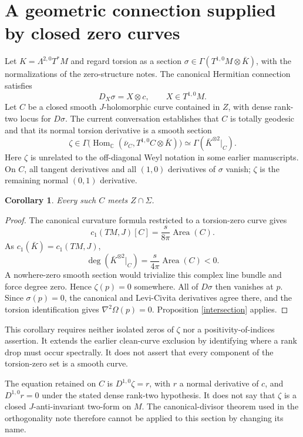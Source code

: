 \documentclass[11pt]{article}
\newtheorem{corollary}[proposition]{Corollary}
\begin{document}
\section{A geometric connection supplied by closed zero curves}
Let $K=\Lambda^{2,0}T^*M$ and regard torsion as a section
$\sigma\in\Gamma(T^{1,0}M\otimes\bar K)$, with the normalizations of
the zero-structure notes. The canonical Hermitian connection satisfies
\[
D_X\sigma=X\otimes c,\qquad X\in T^{1,0}M.
\]
Let $C$ be a closed smooth $J$-holomorphic curve contained in $Z$, with
dense rank-two locus for $D\sigma$. The current conversation establishes
that $C$ is totally geodesic and that its normal torsion derivative is a
smooth section
\[
\zeta\in\Gamma\bigl(\operatorname{Hom}_{\mathbb C}
 (\bar\nu_C,T^{1,0}C\otimes\bar K)\bigr)
\simeq\Gamma(\bar K^{\otimes2}|_C).
\]
Here $\zeta$ is unrelated to the off-diagonal Weyl notation in some
earlier manuscripts. On $C$, all tangent derivatives and all $(1,0)$
derivatives of $\sigma$ vanish; $\zeta$ is the remaining normal
$(0,1)$ derivative.

\begin{corollary}\label{curve}
Every such $C$ meets $Z\cap\Sigma$.
\end{corollary}
\begin{proof}
The canonical curvature formula restricted to a torsion-zero curve gives
\[
c_1(TM,J)[C]=\frac{s}{8\pi}\operatorname{Area}(C).
\]
As $c_1(\bar K)=c_1(TM,J)$,
\[
\deg(\bar K^{\otimes2}|_C)=\frac{s}{4\pi}\operatorname{Area}(C)<0.
\]
A nowhere-zero smooth section would trivialize this complex line bundle
and force degree zero. Hence $\zeta(p)=0$ somewhere. All of $D\sigma$
then vanishes at $p$. Since $\sigma(p)=0$, the canonical and
Levi-Civita derivatives agree there, and the torsion identification gives
$\nabla^2\Omega(p)=0$. Proposition \ref{intersection} applies.
\end{proof}
This corollary requires neither isolated zeros of $\zeta$ nor a
positivity-of-indices assertion. It extends the earlier clean-curve
exclusion by identifying where a rank drop must occur spectrally.
It does not assert that every component of the torsion-zero set is a
smooth curve.

The equation retained on $C$ is
$D^{1,0}\zeta=r$, with $r$ a normal derivative of $c$, and
$D^{1,0}r=0$ under the stated dense rank-two hypothesis.
It does not say that $\zeta$ is a closed $J$-anti-invariant two-form
on $M$. The canonical-divisor theorem used in the orthogonality note
therefore cannot be applied to this section by changing its name.
\end{document}
